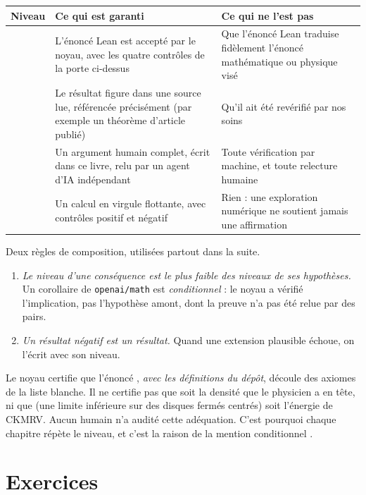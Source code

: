 \begin{center}\small
\begin{tabular}{@{}p{}p{}p{}@{}}
\toprule
Niveau & Ce qui est garanti & Ce qui ne l'est pas \\
\midrule
\tierA{} & L'énoncé Lean est accepté par le noyau, avec les quatre contrôles de la porte ci-dessus & Que l'énoncé Lean traduise fidèlement l'énoncé mathématique ou physique visé \\
\tierL{} & Le résultat figure dans une source lue, référencée précisément (par exemple un théorème d'article publié) & Qu'il ait été revérifié par nos soins \\
\tierC{} & Un argument humain complet, écrit dans ce livre, relu par un agent d'IA indépendant & Toute vérification par machine, et toute relecture humaine \\
\tierX{} & Un calcul en virgule flottante, avec contrôles positif et négatif & Rien : une exploration numérique ne soutient jamais une affirmation \\
\bottomrule
\end{tabular}
\end{center}

Deux règles de composition, utilisées partout dans la suite.
\begin{enumerate}
\item \emph{Le niveau d'une conséquence est le plus faible des niveaux de ses hypothèses.} Un corollaire de \texttt{openai/math} est \tierA{} \emph{conditionnel} : le noyau a
vérifié l'implication, pas l'hypothèse amont, dont la preuve n'a pas été relue par des pairs.
\item \emph{Un résultat négatif est un résultat.} Quand une extension plausible échoue, on l'écrit avec son niveau.
\end{enumerate}

\begin{warnbox}
Le noyau certifie que l'énoncé , \emph{avec les définitions du dépôt}, découle des axiomes de la liste blanche. Il ne certifie
pas que  soit la densité que le physicien a en tête, ni que  (une limite inférieure sur des disques fermés centrés) soit l'énergie de CKMRV. Aucun humain
n'a audité cette adéquation. C'est pourquoi chaque chapitre répète le niveau, et c'est la raison de la mention \og conditionnel \fg{}.
\end{warnbox}

\section*{Exercices}
\label{ch1:sec:exos}


